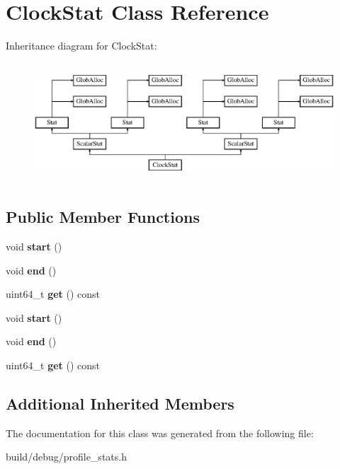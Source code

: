 \hypertarget{classClockStat}{\section{Clock\-Stat Class Reference}
\label{classClockStat}
}
Inheritance diagram for Clock\-Stat\-:\begin{figure}[H]
\begin{center}
\leavevmode
\includegraphics[height=4.487180cm]{classClockStat}
\end{center}
\end{figure}
\subsection*{Public Member Functions}
\begin{DoxyCompactItemize}
\item 
\hypertarget{classClockStat_aa45f73112d2c9f8ad79f33a50610577d}{void {\bfseries start} ()}\label{classClockStat_aa45f73112d2c9f8ad79f33a50610577d}

\item 
\hypertarget{classClockStat_a8bbe37eb00c3fe0fb0615df8e3f9f16a}{void {\bfseries end} ()}\label{classClockStat_a8bbe37eb00c3fe0fb0615df8e3f9f16a}

\item 
\hypertarget{classClockStat_ac5a756bd6bea1ade23d31630e1b5c0ca}{uint64\-\_\-t {\bfseries get} () const }\label{classClockStat_ac5a756bd6bea1ade23d31630e1b5c0ca}

\item 
\hypertarget{classClockStat_aa45f73112d2c9f8ad79f33a50610577d}{void {\bfseries start} ()}\label{classClockStat_aa45f73112d2c9f8ad79f33a50610577d}

\item 
\hypertarget{classClockStat_a8bbe37eb00c3fe0fb0615df8e3f9f16a}{void {\bfseries end} ()}\label{classClockStat_a8bbe37eb00c3fe0fb0615df8e3f9f16a}

\item 
\hypertarget{classClockStat_ac5a756bd6bea1ade23d31630e1b5c0ca}{uint64\-\_\-t {\bfseries get} () const }\label{classClockStat_ac5a756bd6bea1ade23d31630e1b5c0ca}

\end{DoxyCompactItemize}
\subsection*{Additional Inherited Members}


The documentation for this class was generated from the following file\-:\begin{DoxyCompactItemize}
\item 
build/debug/profile\-\_\-stats.\-h\end{DoxyCompactItemize}
